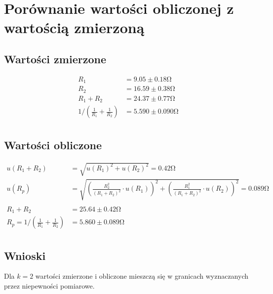 \documentclass[12pt]{article}
\begin{document}
\section{Porównanie wartości obliczonej z wartością zmierzoną}
\subsection{Wartości zmierzone}
\begin{align*}
R_1 &= 9.05 \pm 0.18 \si{\ohm}\\
R_2 &= 16.59 \pm 0.38 \si{\ohm}\\
R_1 + R_2 &= 24.37 \pm 0.77\si{\ohm}\\
1/\left(\frac{1}{R_1} + \frac{1}{R_2}\right) &= 5.590 \pm 0.090\si{\ohm}\\
\end{align*}
\subsection{Wartości obliczone}
\begin{align*}
u(R_1 + R_2) &= \sqrt{u(R_1)^2 + u(R_2)^2} = 0.42\si{\ohm}\\
u(R_p) &= \sqrt{\left(\frac{R_2^2}{(R_1 + R_2)^2}\cdot u(R_1)\right)^2 + \left(\frac{R_1^2}{(R_1 + R_2)^2}\cdot u(R_2)\right)^2} = 0.089\si{\ohm}\\\\
R_1 + R_2 &= 25.64 \pm 0.42\si{\ohm}\\
R_p = 1/\left(\frac{1}{R_1} + \frac{1}{R_2}\right) &= 5.860 \pm 0.089\si{\ohm}\\
\end{align*}
\subsection{Wnioski}
Dla $k = 2$ wartości zmierzone i obliczone mieszczą się w granicach wyznaczanych przez niepewności pomiarowe.
\end{document}
